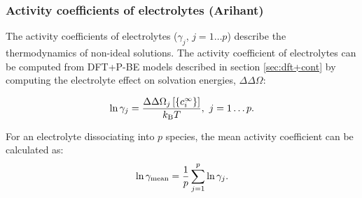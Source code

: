 \documentclass[../main.tex]{subfiles}
\begin{document}
\subsubsection{Activity coefficients of electrolytes (Arihant)}
\label{sec:tf}

The activity coefficients of electrolytes ($\gamma_j$, $j=1\dots p$) describe the thermodynamics of non-ideal solutions.\cite{Atkins2014} The activity coefficient of electrolytes can be computed from DFT+P-BE models described in section \ref{sec:dft+cont} by computing the electrolyte effect on solvation energies, $\Delta\Delta\Omega$:\cite{Ringe2016, Dziedzic2020}







\begin{equation}
    \label{eq:activityj}
   \ln{\gamma_j}  =\frac{\Delta\Delta\Omega_j\left[\{c_i^{\infty}\}\right]}{k_{\textrm{B}} T}, \ j=1\dots p.
\end{equation}

For an electrolyte dissociating into $p$ species, the mean activity coefficient can be calculated as:
\begin{equation}
    \label{eq:activitymean}
    \ln \gamma_{\rm mean} = \frac{1}{p}\sum_{j=1}^p \ln \gamma_j.
\end{equation}
\end{document}

